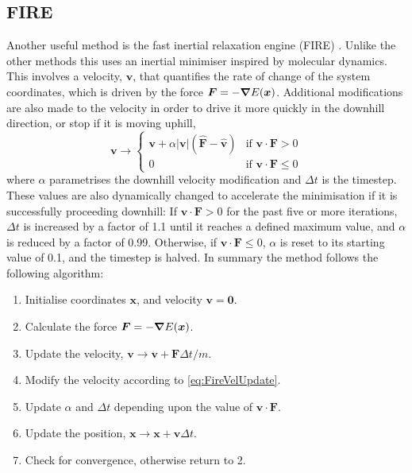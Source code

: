 \subsection{FIRE}
Another useful method is the fast inertial relaxation engine (FIRE) \cite{Bitzek2006}.
Unlike the other methods this uses an inertial minimiser inspired by molecular dynamics.
This involves a velocity, $\bm{v}$, that quantifies the rate of change of the system coordinates, which is driven by the force $\bm{F} = - \bm{\nabla} E(\bm{x})$.
Additional modifications are also made to the velocity in order to drive it more quickly in the downhill direction, or stop if it is moving uphill,
\begin{equation}
  \bm{v} \rightarrow
  \begin{cases}
    \bm{v} + \alpha |\bm{v}| (\bm{\hat{F}} - \bm{\hat{v}}) & \text{if } \bm{v} \cdot \bm{F} > 0\\
    0 & \text{if } \bm{v} \cdot \bm{F} \le 0
  \end{cases}
  \label{eq:FireVelUpdate}
\end{equation}
where $\alpha$ parametrises the downhill velocity modification and $\Delta t$ is the timestep.
These values are also dynamically changed to accelerate the minimisation if it is successfully proceeding downhill:
If $\bm{v} \cdot \bm{F} > 0$ for the past five or more iterations, $\Delta t$ is increased by a factor of 1.1 until it reaches a defined maximum value, and $\alpha$ is reduced by a factor of 0.99.
Otherwise, if $\bm{v} \cdot \bm{F} \le 0$, $\alpha$ is reset to its starting value of 0.1, and the timestep is halved.
In summary the method follows the following algorithm:
\begin{enumerate}[leftmargin=*]
  \item Initialise coordinates $\bm{x}$, and velocity $\bm{v}=\bm{0}$.
  \item Calculate the force $\bm{F} = - \bm{\nabla} E(\bm{x})$.
  \item Update the velocity, $\bm{v} \rightarrow \bm{v} + \bm{F} \Delta t / m$.
  \item Modify the velocity according to \cref{eq:FireVelUpdate}.
  \item Update $\alpha$ and $\Delta t$ depending upon the value of $\bm{v} \cdot \bm{F}$.
  \item Update the position, $\bm{x} \rightarrow \bm{x} + \bm{v} \Delta t$.
  \item Check for convergence, otherwise return to 2.
\end{enumerate}


